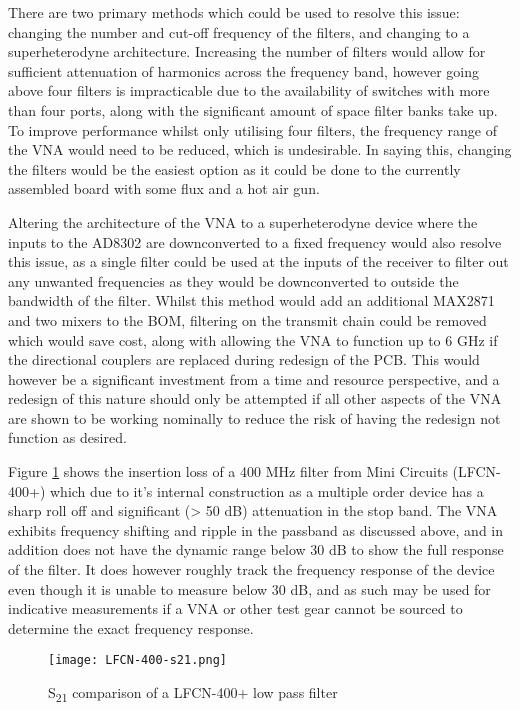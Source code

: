 There are two primary methods which could be used to resolve this issue: changing the number and cut-off frequency of the filters, and changing to a superheterodyne architecture. Increasing the number of filters would allow for sufficient attenuation of harmonics across the frequency band, however going above four filters is impracticable due to the availability of switches with more than four ports, along with the significant amount of space filter banks take up. To improve performance whilst only utilising four filters, the frequency range of the VNA would need to be reduced, which is undesirable. In saying this, changing the filters would be the easiest option as it could be done to the currently assembled board with some flux and a hot air gun. 

Altering the architecture of the VNA to a superheterodyne device where the inputs to the AD8302 are downconverted to a fixed frequency would also resolve this issue, as a single filter could be used at the inputs of the receiver to filter out any unwanted frequencies as they would be downconverted to outside the bandwidth of the filter. Whilst this method would add an additional MAX2871 and two mixers to the BOM, filtering on the transmit chain could be removed which would save cost, along with allowing the VNA to function up to 6 GHz if the directional couplers are replaced during redesign of the PCB. This would however be a significant investment from a time and resource perspective, and a redesign of this nature should only be attempted if all other aspects of the VNA are shown to be working nominally to reduce the risk of having the redesign not function as desired. 

Figure \ref{fig:compare_lfcn_s21} shows the insertion loss of a 400 MHz filter from Mini Circuits (LFCN-400+) which due to it's internal construction as a multiple order device has a sharp roll off and significant (> 50 dB) attenuation in the stop band. The VNA exhibits frequency shifting and ripple in the passband as discussed above, and in addition does not have the dynamic range below 30 dB to show the full response of the filter. It does however roughly track the frequency response of the device even though it is unable to measure below 30 dB, and as such may be used for indicative measurements if a VNA or other test gear cannot be sourced to determine the exact frequency response. 
\begin{figure}[H]
	\centering
	\texttt{[image: LFCN-400-s21.png]}
	\caption{S\textsubscript{21} comparison of a LFCN-400+ low pass filter}
	\label{fig:compare_lfcn_s21}
\end{figure}

